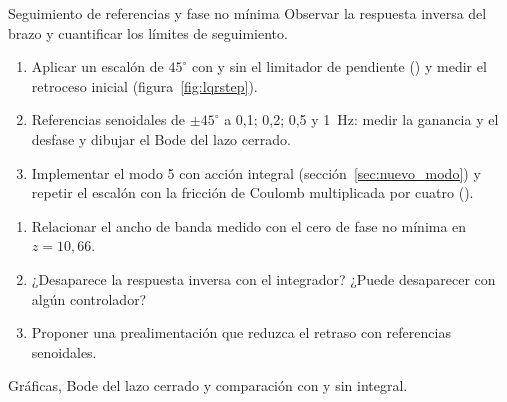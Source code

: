 \label{pr:segui}
\begin{practica}{Seguimiento de referencias y fase no mínima}
\objetivos Observar la respuesta inversa del brazo y cuantificar los límites de seguimiento.
\procedimiento
\begin{enumerate}
  \item Aplicar un escalón de $45^\circ$ con y sin el limitador de pendiente () y medir el retroceso inicial (figura~\ref{fig:lqrstep}).
  \item Referencias senoidales de $\pm45^\circ$ a 0,1; 0,2; 0,5 y \SI{1}{Hz}: medir la ganancia y el desfase y dibujar el Bode del lazo cerrado.
  \item Implementar el modo 5 con acción integral (sección~\ref{sec:nuevo_modo}) y repetir el escalón con la fricción de Coulomb multiplicada por cuatro ().
\end{enumerate}
\preguntas
\begin{enumerate}
  \item Relacionar el ancho de banda medido con el cero de fase no mínima en $z=10{,}66$.
  \item ¿Desaparece la respuesta inversa con el integrador? ¿Puede desaparecer con algún controlador?
  \item Proponer una prealimentación que reduzca el retraso con referencias senoidales.
\end{enumerate}
\entregables Gráficas, Bode del lazo cerrado y comparación con y sin integral.
\end{practica}

